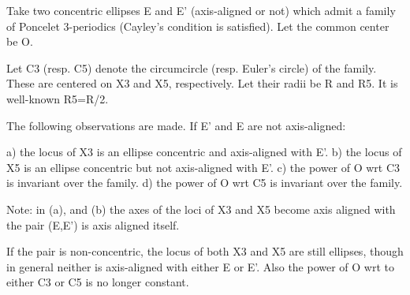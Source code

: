 Take two concentric ellipses E and E' (axis-aligned or not) which admit a family of Poncelet 3-periodics (Cayley's condition is satisfied). Let the common center be O.

Let C3 (resp. C5) denote the circumcircle (resp. Euler's circle) of the family. These are centered on X3 and X5, respectively. Let their radii be R and R5. It is well-known R5=R/2.

The following observations are made. If E' and E are not axis-aligned:

a) the locus of X3 is an ellipse concentric and axis-aligned with E'.
b) the locus of X5 is an ellipse concentric but not axis-aligned with E'.
c) the power of O wrt C3 is invariant over the family.
d) the power of O wrt C5 is invariant over the family.

Note: in (a), and (b) the axes of the loci of X3 and X5 become axis aligned with the pair (E,E') is axis aligned itself.

If the pair is non-concentric, the locus of both X3 and X5 are still ellipses, though in general neither is axis-aligned with either E or E'. Also the power of O wrt to either C3 or C5 is no longer constant.
